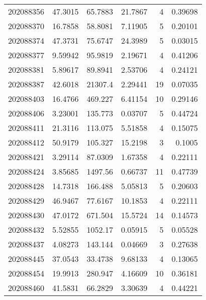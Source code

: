 \begin{tabular}{rrrrrr}
 202088356 &         47.3015  &       65.7883 &           21.7867  &           4 & 0.39698 \\
 202088370 &         16.7858  &       58.8081 &            7.11905 &           5 & 0.20101 \\
 202088374 &         47.3731  &       75.6747 &           24.3989  &           5 & 0.03015 \\
 202088377 &          9.59942 &       95.9819 &            2.19671 &           4 & 0.41206 \\
 202088381 &          5.89617 &       89.8941 &            2.53706 &           4 & 0.24121 \\
 202088387 &         42.6018  &    21307.4    &            2.29441 &          19 & 0.07035 \\
 202088403 &         16.4766  &      469.227  &            6.41154 &          10 & 0.29146 \\
 202088406 &          3.23001 &      135.773  &            0.03707 &           5 & 0.44724 \\
 202088411 &         21.3116  &      113.075  &            5.51858 &           4 & 0.15075 \\
 202088412 &         50.9179  &      105.327  &           15.2198  &           3 & 0.1005  \\
 202088421 &          3.29114 &       87.0309 &            1.67358 &           4 & 0.22111 \\
 202088424 &          3.85685 &     1497.56   &            0.66737 &          11 & 0.47739 \\
 202088428 &         14.7318  &      166.488  &            5.05813 &           5 & 0.20603 \\
 202088429 &         46.9467  &       77.6167 &           10.1853  &           4 & 0.22111 \\
 202088430 &         47.0172  &      671.504  &           15.5724  &          14 & 0.14573 \\
 202088432 &          5.52855 &     1052.17   &            0.05915 &           5 & 0.05528 \\
 202088437 &          4.08273 &      143.144  &            0.04669 &           3 & 0.27638 \\
 202088445 &         37.0543  &       33.4738 &            9.68133 &           4 & 0.13065 \\
 202088454 &         19.9913  &      280.947  &            4.16609 &          10 & 0.36181 \\
 202088460 &         41.5831  &       66.2829 &            3.30639 &           4 & 0.44221 \\

\end{tabular}
